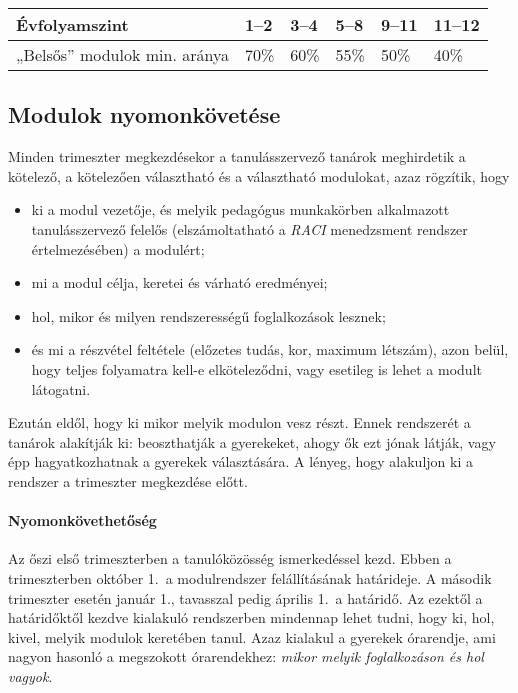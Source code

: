 \begin{longtable}[]{@{}llllll@{}}
\toprule
Évfolyamszint & 1--2 & 3--4 & 5--8 & 9--11 & 11--12\tabularnewline
\midrule
\endhead
„Belsős'' modulok min. aránya & 70\% & 60\% & 55\% & 50\% &
40\%\tabularnewline
\bottomrule
\end{longtable}

\hypertarget{modulok-nyomonkovetese}{%
\subsection{Modulok nyomonkövetése}\label{modulok-nyomonkovetese}}

Minden trimeszter megkezdésekor a tanulásszervező tanárok meghirdetik a
kötelező, a kötelezően választható és a választható modulokat, azaz
rögzítik, hogy

\begin{itemize}
\item
  ki a modul vezetője, és melyik pedagógus munkakörben alkalmazott
  tanulásszervező felelős (elszámoltatható a
  {\emph{RACI}}
  menedzsment
  rendszer értelmezésében) a modulért;
\item
  mi a modul célja, keretei és várható eredményei;
\item
  hol, mikor és milyen rendszerességű foglalkozások lesznek;
\item
  és mi a részvétel feltétele (előzetes tudás, kor, maximum létszám),
  azon belül, hogy teljes folyamatra kell-e
  elköteleződni, vagy esetileg is lehet a modult látogatni.
\end{itemize}

Ezután eldől, hogy ki mikor melyik modulon vesz részt. Ennek rendszerét
a tanárok alakítják ki: beoszthatják a gyerekeket, ahogy ők ezt jónak
látják, vagy épp hagyatkozhatnak a gyerekek választására. A lényeg, hogy
alakuljon ki a rendszer a trimeszter megkezdése előtt.

\hypertarget{nyomonkovethetoseg}{%
\paragraph{Nyomonkövethetőség}\label{nyomonkovethetoseg}}

Az őszi első trimeszterben a tanulóközösség ismerkedéssel kezd. Ebben a
trimeszterben október 1.\ a modulrendszer felállításának határideje. A
második trimeszter esetén január 1., tavasszal pedig április 1.\ a határidő.
Az ezektől a határidőktől kezdve kialakuló rendszerben mindennap lehet
tudni, hogy ki, hol, kivel, melyik modulok keretében tanul. Azaz
kialakul a gyerekek órarendje, ami nagyon hasonló a megszokott
órarendekhez: \emph{mikor melyik foglalkozáson és hol vagyok}.

